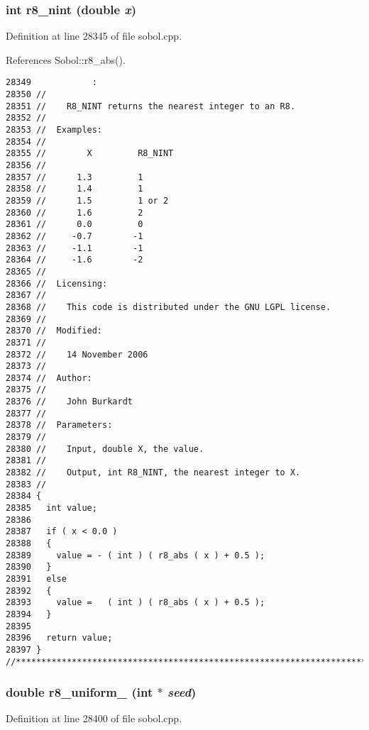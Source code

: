 \subsubsection{\setlength{\rightskip}{0pt plus 5cm}int r8\_\-nint (double {\em x})}\label{test_2sobol_8H_7e0d15a4d0accb8c91928f44aa302394}




Definition at line 28345 of file sobol.cpp.

References Sobol::r8\_\-abs().

\begin{Code}\begin{verbatim}28349            :
28350 //
28351 //    R8_NINT returns the nearest integer to an R8.
28352 //
28353 //  Examples:
28354 //
28355 //        X         R8_NINT
28356 //
28357 //      1.3         1
28358 //      1.4         1
28359 //      1.5         1 or 2
28360 //      1.6         2
28361 //      0.0         0
28362 //     -0.7        -1
28363 //     -1.1        -1
28364 //     -1.6        -2
28365 //
28366 //  Licensing:
28367 //
28368 //    This code is distributed under the GNU LGPL license. 
28369 //
28370 //  Modified:
28371 //
28372 //    14 November 2006
28373 //
28374 //  Author:
28375 //
28376 //    John Burkardt
28377 //
28378 //  Parameters:
28379 //
28380 //    Input, double X, the value.
28381 //
28382 //    Output, int R8_NINT, the nearest integer to X.
28383 //
28384 {
28385   int value;
28386 
28387   if ( x < 0.0 )
28388   {
28389     value = - ( int ) ( r8_abs ( x ) + 0.5 );
28390   }
28391   else
28392   {
28393     value =   ( int ) ( r8_abs ( x ) + 0.5 );
28394   }
28395 
28396   return value;
28397 }
//****************************************************************************80
\end{verbatim}
\end{Code}


\subsubsection{\setlength{\rightskip}{0pt plus 5cm}double r8\_\-uniform\_ (int $\ast$ {\em seed})}\label{test_2sobol_8H_3d16b58f491227d91093012f40694e0f}




Definition at line 28400 of file sobol.cpp.

